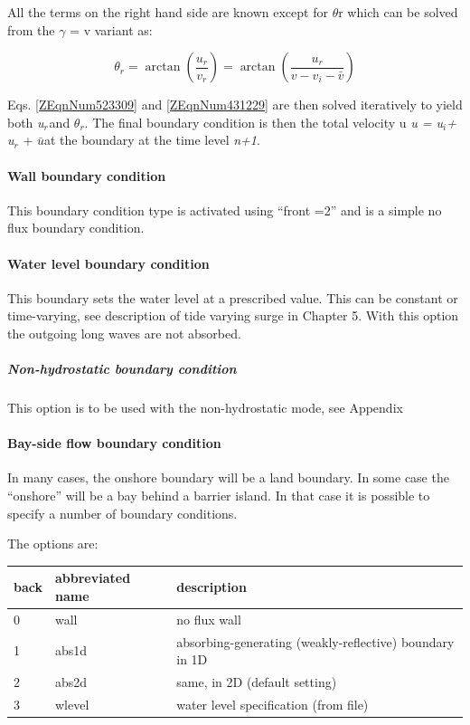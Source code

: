 All the terms on the right hand side are known except for $\theta $r which can be solved from the $\gamma $ = v variant as:

\begin{equation} \label{ZEqnNum431229} 
\theta _{r} =\arctan \left(\frac{u_{r} }{v_{r} } \right)=\arctan \left(\frac{u_{r} }{v-v_{i} -\bar{v}} \right) 
\end{equation} 

Eqs. \eqref{ZEqnNum523309} and \eqref{ZEqnNum431229} are then solved iteratively to yield both \textit{u${}_{r}$}${}_{ }$and \textit{$\theta $${}_{r}$}. The final boundary condition is then the total velocity u\textit{ u = u${}_{i }$+ u${}_{r}$} + $\bar{u}$at the boundary at the time level \textit{n+1}.

\paragraph{Wall boundary condition}

This boundary condition type is activated using ``front =2'' and is a simple no flux boundary condition.

\paragraph{Water level boundary condition}

This boundary sets the water level at a prescribed value. This can be constant or time-varying, see description of tide varying surge in Chapter 5. With this option the outgoing long waves are not absorbed. 

\subparagraph{Non-hydrostatic boundary condition}

This option is to be used with the non-hydrostatic mode, see Appendix

\paragraph{Bay-side flow boundary condition}

In many cases, the onshore boundary will be a land boundary. In some case the ``onshore'' will be a bay behind a barrier island. In that case it is possible to specify a number of boundary conditions.

The options are:

\begin{tabular}{|p{0.5in}|p{0.8in}|p{2.6in}|} \hline 
\textbf{back} & abbreviated name & description \\ \hline 
0 & wall & no flux wall \\ \hline 
1 & abs1d & absorbing-generating (weakly-reflective) boundary in 1D \\ \hline 
2 & abs2d & same, in 2D (default setting) \\ \hline 
3 & wlevel & water level specification (from file) \\ \hline 
\end{tabular}

